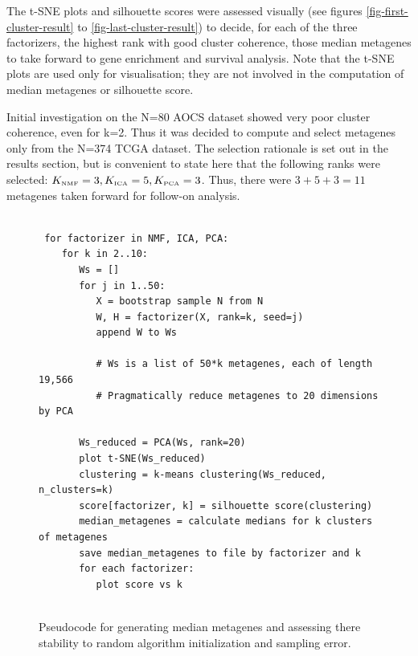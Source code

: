 \documentclass[draft, tikz, 12pt,a4paper,oneside,fleqn]{article}
\begin{document}
The t-SNE plots and silhouette scores were assessed visually (see figures \ref{fig-first-cluster-result} to \ref{fig-last-cluster-result}) to decide, for each of the three factorizers, the highest rank with good cluster coherence, those median metagenes to take forward to gene enrichment and survival analysis.   
Note that the t-SNE plots are used only for visualisation; they are not involved in the computation of median metagenes or silhouette score.

Initial investigation on the N=80 AOCS dataset showed very poor cluster coherence, even for k=2.   Thus it was decided to compute and select metagenes only from the N=374 TCGA dataset.   
The selection rationale is set out in the results section, but is convenient to state here that the following ranks were selected:
$K_{\mbox{\tiny NMF}} = 3, K_{\mbox{\tiny ICA}} = 5, K_{\mbox{\tiny PCA}} =3$.  Thus, there were $3 + 5 + 3 = 11$ metagenes taken forward for follow-on analysis.

\begin{figure}[ht]
\begin{center}
\begin{Verbatim}[baselinestretch=1, frame=single, rulecolor=\color{blue}, label=Metagene Stability Assessment, fontfamily=courier, fontsize=\small]

 for factorizer in NMF, ICA, PCA:
    for k in 2..10:
       Ws = []
       for j in 1..50:
          X = bootstrap sample N from N
          W, H = factorizer(X, rank=k, seed=j)
          append W to Ws
   	     
          # Ws is a list of 50*k metagenes, each of length 19,566
          # Pragmatically reduce metagenes to 20 dimensions by PCA
   	  
       Ws_reduced = PCA(Ws, rank=20)
       plot t-SNE(Ws_reduced)
       clustering = k-means clustering(Ws_reduced, n_clusters=k)
       score[factorizer, k] = silhouette score(clustering)	  
       median_metagenes = calculate medians for k clusters of metagenes
       save median_metagenes to file by factorizer and k
       for each factorizer:
          plot score vs k
      
\end{Verbatim}
\end{center}
\caption{Pseudocode for generating median metagenes and assessing there stability to random algorithm initialization and sampling error.}
\label{fig-clustering-psuedocode}
\end{figure}
	   	  
\end{document}
